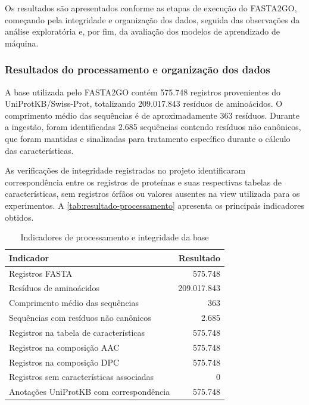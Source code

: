 Os resultados são apresentados conforme as etapas de execução do FASTA2GO, começando pela integridade e organização dos dados, seguida das observações da análise exploratória e, por fim, da avaliação dos modelos de aprendizado de máquina.

\subsubsection{Resultados do processamento e organização dos dados}

A base utilizada pelo FASTA2GO contém 575.748 registros provenientes do UniProtKB/Swiss-Prot, totalizando 209.017.843 resíduos de aminoácidos. O comprimento médio das sequências é de aproximadamente 363 resíduos. Durante a ingestão, foram identificadas 2.685 sequências contendo resíduos não canônicos, que foram mantidas e sinalizadas para tratamento específico durante o cálculo das características.

As verificações de integridade registradas no projeto identificaram correspondência entre os registros de proteínas e suas respectivas tabelas de características, sem registros órfãos ou valores ausentes na view utilizada para os experimentos. A \autoref{tab:resultado-processamento} apresenta os principais indicadores obtidos.

\begin{table}[htb]
    \centering
    \ABNTEXfontereduzida
    \caption{Indicadores de processamento e integridade da base}
    \label{tab:resultado-processamento}
    \begin{tabular}{lr}
        \toprule
        \textbf{Indicador} & \textbf{Resultado} \\
        \midrule
        Registros FASTA & 575.748 \\
        Resíduos de aminoácidos & 209.017.843 \\
        Comprimento médio das sequências & 363 \\
        Sequências com resíduos não canônicos & 2.685 \\
        Registros na tabela de características & 575.748 \\
        Registros na composição AAC & 575.748 \\
        Registros na composição DPC & 575.748 \\
        Registros sem características associadas & 0 \\
        Anotações UniProtKB com correspondência & 575.748 \\
        \bottomrule
    \end{tabular}
\end{table}

